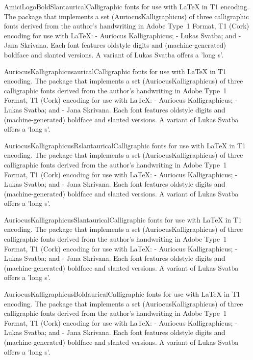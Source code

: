 \documentclass{ddltxtyp}
\begin{document}
\begin{package}{AmiciLogoBoldSlant}{aurical}{Calligraphic fonts for use with {\LaTeX} in T1 encoding.}
The package that implements a set (AuriocusKalligraphicus) of
three calligraphic fonts derived from the author's handwriting
in Adobe Type~1 Format, T1 (Cork) encoding for use with {\LaTeX}:
- Auriocus Kalligraphicus; - Lukas Svatba; and - Jana Skrivana.
Each font features oldstyle digits and (machine-generated)
boldface and slanted versions. A variant of Lukas Svatba offers
a 'long s'.
\end{package}
\begin{package}{AuriocusKalligraphicus}{aurical}{Calligraphic fonts for use with {\LaTeX} in T1 encoding.}
The package that implements a set (AuriocusKalligraphicus) of
three calligraphic fonts derived from the author's handwriting
in Adobe Type~1 Format, T1 (Cork) encoding for use with {\LaTeX}:
- Auriocus Kalligraphicus; - Lukas Svatba; and - Jana Skrivana.
Each font features oldstyle digits and (machine-generated)
boldface and slanted versions. A variant of Lukas Svatba offers
a 'long s'.
\end{package}
\begin{package}{AuriocusKalligraphicusRslant}{aurical}{Calligraphic fonts for use with {\LaTeX} in T1 encoding.}
The package that implements a set (AuriocusKalligraphicus) of
three calligraphic fonts derived from the author's handwriting
in Adobe Type~1 Format, T1 (Cork) encoding for use with {\LaTeX}:
- Auriocus Kalligraphicus; - Lukas Svatba; and - Jana Skrivana.
Each font features oldstyle digits and (machine-generated)
boldface and slanted versions. A variant of Lukas Svatba offers
a 'long s'.
\end{package}
\begin{package}{AuriocusKalligraphicusSlant}{aurical}{Calligraphic fonts for use with {\LaTeX} in T1 encoding.}
The package that implements a set (AuriocusKalligraphicus) of
three calligraphic fonts derived from the author's handwriting
in Adobe Type~1 Format, T1 (Cork) encoding for use with {\LaTeX}:
- Auriocus Kalligraphicus; - Lukas Svatba; and - Jana Skrivana.
Each font features oldstyle digits and (machine-generated)
boldface and slanted versions. A variant of Lukas Svatba offers
a 'long s'.
\end{package}
\begin{package}{AuriocusKalligraphicusBold}{aurical}{Calligraphic fonts for use with {\LaTeX} in T1 encoding.}
The package that implements a set (AuriocusKalligraphicus) of
three calligraphic fonts derived from the author's handwriting
in Adobe Type~1 Format, T1 (Cork) encoding for use with {\LaTeX}:
- Auriocus Kalligraphicus; - Lukas Svatba; and - Jana Skrivana.
Each font features oldstyle digits and (machine-generated)
boldface and slanted versions. A variant of Lukas Svatba offers
a 'long s'.
\end{package}
\end{document}
